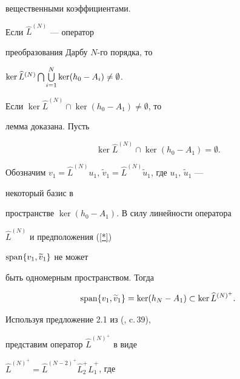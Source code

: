 вещественными коэффициентами.





\begin{lem}


Если $\widehat{L}^{(N)}$ --- оператор


преобразования Дарбу $N$-го порядка, то


$\ker \widehat{L}^{(N)}\bigcap\linebreak


\bigcup\limits_{i=1}^N\ker (h_0-A_i)\neq \emptyset$.


\end{lem}





Если $\ker \widehat{L}^{(N)}\cap \ker (h_0-A_1)\neq \emptyset $, то


лемма доказана. Пусть


\begin{equation}


\ker \widehat{L}^{(N)}\cap \ker (h_0-A_1)= \emptyset.


\label{*}


\end{equation}


Обозначим $v_1=\widehat L^{(N)}u_1$, $\widetilde v_1=\widehat


L^{(N)}\widetilde u_1$, где $u_1$, $\widetilde u_1$ ---


некоторый базис в


пространстве $\ker (h_0-A_1)$. В силу линейности оператора


$\widehat L^{(N)}$ и предположения (\ref{*})\,


$\operatorname{span}\{ v_1,\widetilde v_1\}$ не может


быть одномерным пространством. Тогда


\begin{equation}


\Span\{ v_1,\widetilde{v}_1\} =\ker (h_N-A_1)\subset \ker


\widehat{L}^{(N)^{+}}.


\label{**}


\end{equation}


Используя предложение 2.1 из (\cite{iv}, c.\,39),


представим оператор $\widehat{L}^{(N)^{+}}$ в виде


$\widehat{L}^{(N)^{+}}{=}\widehat{L}^{(N-


2)^{+}}\widehat{L}_2^{+}\widehat{L}_1^{+}$, где


